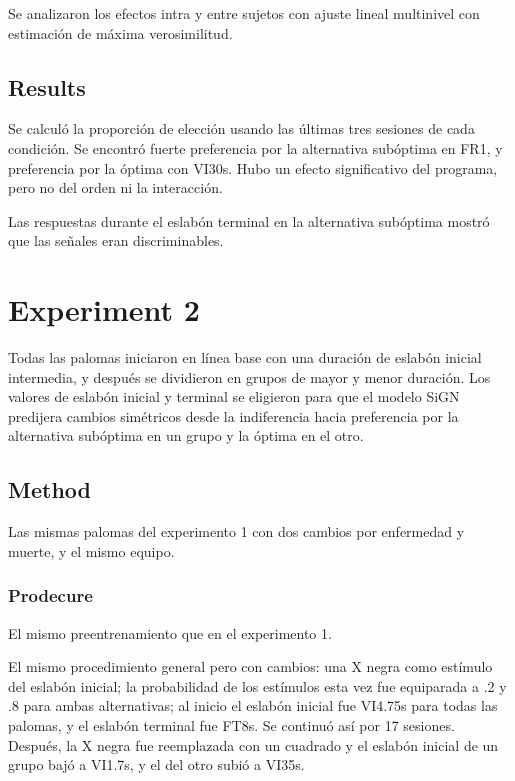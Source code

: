 \documentclass[a4paper,12pt]{article}
\begin{document}
Se analizaron los efectos intra y entre sujetos con ajuste lineal multinivel con estimación de máxima verosimilitud.

\subsection{Results}

Se calculó la proporción de elección usando las últimas tres sesiones de cada condición.
Se encontró fuerte preferencia por la alternativa subóptima en FR1, y preferencia por la óptima con VI30s.
Hubo un efecto significativo del programa, pero no del orden ni la interacción.

Las respuestas durante el eslabón terminal en la alternativa subóptima mostró que las señales eran discriminables.

\section{Experiment 2}

Todas las palomas iniciaron en línea base con una duración de eslabón inicial intermedia, y después se dividieron en grupos de mayor y menor duración.
Los valores de eslabón inicial y terminal se eligieron para que el modelo SiGN predijera cambios simétricos desde la indiferencia hacia preferencia por la alternativa subóptima en un grupo y la óptima en el otro.

\subsection{Method}

Las mismas palomas del experimento 1 con dos cambios por enfermedad y muerte, y el mismo equipo.

\subsubsection{Prodecure}

El mismo preentrenamiento que en el experimento 1.

El mismo procedimiento general pero con cambios: una X negra como estímulo del eslabón inicial; la probabilidad de los estímulos esta vez fue equiparada a .2 y .8 para ambas alternativas; al inicio el eslabón inicial fue VI4.75s para todas las palomas, y el eslabón terminal fue FT8s.
Se continuó así por 17 sesiones.
Después, la X negra fue reemplazada con un cuadrado y el eslabón inicial de un grupo bajó a VI1.7s, y el del otro subió a VI35s.
\end{document}
